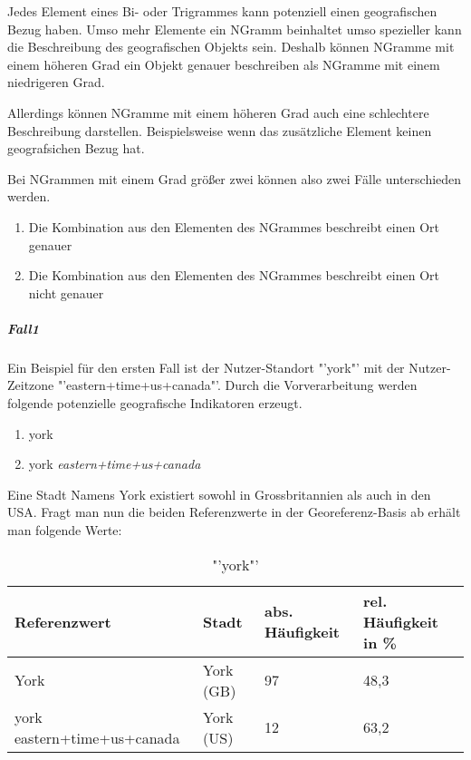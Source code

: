 					Jedes Element eines Bi- oder Trigrammes kann potenziell einen geografischen Bezug haben. 
					Umso mehr Elemente ein NGramm beinhaltet umso spezieller kann die Beschreibung des geografischen Objekts sein.
					Deshalb können NGramme mit einem höheren Grad ein Objekt genauer beschreiben als NGramme mit einem niedrigeren Grad.

					Allerdings können NGramme mit einem höheren Grad auch eine schlechtere Beschreibung darstellen. 
					Beispielsweise wenn das zusätzliche Element keinen geografsichen Bezug hat.

					Bei NGrammen mit einem Grad größer zwei können also zwei Fälle unterschieden werden.

					\begin{enumerate}
						\item Die Kombination aus den Elementen des NGrammes beschreibt einen Ort genauer
						\item Die Kombination aus den Elementen des NGrammes beschreibt einen Ort nicht genauer
					\end{enumerate}

					\subparagraph{Fall1} 

						Ein Beispiel für den ersten Fall ist der Nutzer-Standort "'york"' mit der Nutzer-Zeitzone "'eastern+time+us+canada"'. 
						Durch die Vorverarbeitung werden folgende potenzielle geografische Indikatoren erzeugt.
						\begin{enumerate}		
							\item york
							\item york \textit{eastern+time+us+canada}
						\end{enumerate}		

						Eine Stadt Namens York existiert sowohl in Grossbritannien als auch in den USA.
						Fragt man nun die beiden Referenzwerte in der Georeferenz-Basis ab erhält man folgende Werte:

							\begin{table}[h]
								\centering
									\caption{"'york"'}
									\label{tab:york}
									\begin{tabular}{|l|l|l|l|}
									\hline
									Referenzwert 				& Stadt  	& abs. Häufigkeit & rel. Häufigkeit in \% \\ \hline \hline
									York          				& York (GB) & 97              & 48,3       \\ \hline
									york eastern+time+us+canada & York (US) & 12              & 63,2        \\ \hline
									\end{tabular}
							\end{table}

